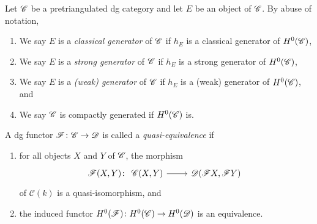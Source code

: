 \documentclass[dissertation.tex]{subfiles}
\begin{document}
        \begin{defn}
          Let $\mathscr{C}$ be a pretriangulated dg category and let $E$ be an object of $\mathscr{C}$.
          By abuse of notation, 
          \begin{enumerate}
          \item
            We say $E$ is a {\it classical generator} of $\mathscr{C}$ if $h_E$ is a classical generator of $H^0(\mathscr{C})$,
          \item
            We say $E$ is a {\it strong generator} of $\mathscr{C}$ if $h_E$ is a strong generator of $H^0(\mathscr{C})$,
          \item
            We say $E$ is a {\it (weak) generator} of $\mathscr{C}$ if $h_E$ is a (weak) generator of $H^0(\mathscr{C})$, and
          \item
            We say $\mathscr{C}$ is compactly generated if $H^0(\mathscr{C})$ is.
          \end{enumerate}
        \end{defn}


        \begin{defn}
          A dg functor $\mathscr{F} \colon \mathscr{C} \rightarrow \mathscr{D}$ is called a {\it quasi-equivalence} if 
          \begin{enumerate}
          \item
            for all objects $X$ and $Y$ of $\mathscr{C}$, the morphism
            $$\mathscr{F}(X,Y) \colon
            \begin{tikzcd}
              \CC(X,Y) \arrow{r} & \D(\mathscr{F}X,\mathscr{F}Y)
            \end{tikzcd}$$
            of $\mathcal{C}(k)$ is a quasi-isomorphism, and
          \item
            the induced functor $H^0(\mathscr{F}) \colon H^0(\mathscr{C}) \rightarrow H^0(\mathscr{D})$ is an equivalence.
          \end{enumerate}
        \end{defn}
\end{document}
